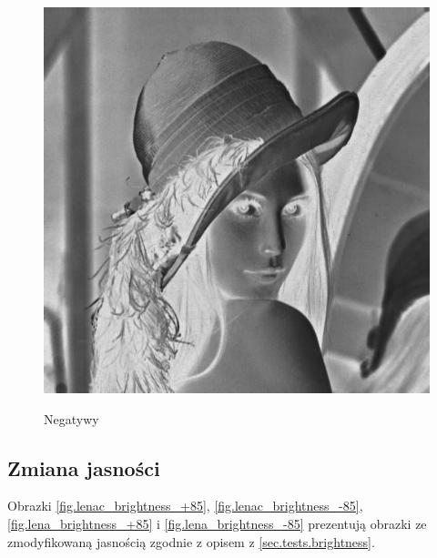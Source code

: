 \documentclass{classrep}
\begin{document}
\begin{figure}
{  \includegraphics[scale=0.5]{img/lena_negative.png}
  \label{fig.lena_negative}
 }
\caption{Negatywy}
\end{figure}

\subsection{Zmiana jasności}
Obrazki \ref{fig.lenac_brightness_+85}, \ref{fig.lenac_brightness_-85}, \ref{fig.lena_brightness_+85} i \ref{fig.lena_brightness_-85} prezentują obrazki ze zmodyfikowaną jasnością zgodnie z opisem z \ref{sec.tests.brightness}.
\end{document}
